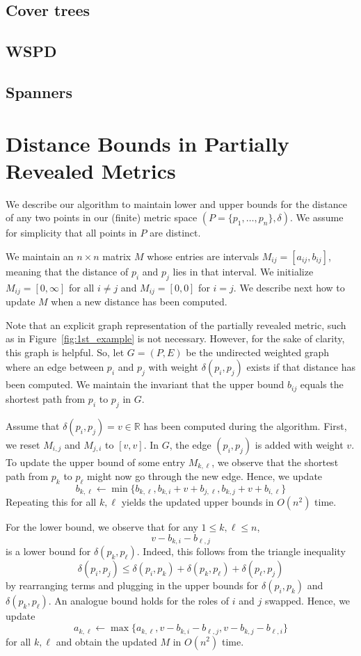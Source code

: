 \documentclass[10pt]{article}
\newcommand{\R}{\mathbb{R}}
\newcommand{\metric}{\delta}
\begin{document}
\subsection{Cover trees}

\subsection{WSPD}

\subsection{Spanners}

\section{Distance Bounds in Partially Revealed Metrics}
%
We describe our algorithm to maintain lower and upper bounds for the
distance of any two points in our (finite) metric space $(P=\{p_1,\ldots,p_n\},\metric)$. We assume for simplicity that all points in $P$ are distinct.

We maintain an $n\times n$ matrix $M$ whose entries
are intervals $M_{ij}=[a_{ij},b_{ij}]$, meaning that the distance
of $p_i$ and $p_j$ lies in that interval. 
We initialize $M_{ij}=[0,\infty]$ for all $i\neq j$
and $M_{ij}=[0,0]$ for $i=j$.
We describe next how to update $M$ when a new distance has been computed.

Note that an explicit graph representation of the partially revealed metric,
such as in Figure~\ref{fig:1st_example} is not necessary. However, for 
the sake of clarity,
this graph is helpful. So, let $G=(P,E)$ be the undirected weighted graph
where an edge between $p_i$ and $p_j$ with weight $\metric(p_i,p_j)$
exists if that distance has been computed. 
We maintain the invariant that the upper bound $b_{ij}$ equals the 
shortest path from $p_i$ to $p_j$ in $G$.

Assume that $\metric(p_i,p_j)=v\in\R$ has been computed during the algorithm.
First, we reset $M_{i,j}$ and $M_{j,i}$ to $[v,v]$. 
In $G$, the edge $(p_i,p_j)$ is added with weight $v$.
To update the upper bound of some entry $M_{k,\ell}$,
we observe that the shortest path from $p_k$ to $p_\ell$ might now
go through the new edge. Hence, we update
%
\[b_{k,\ell}\gets \min\{b_{k,\ell},b_{k,i}+v+b_{j,\ell},b_{k,j}+v+b_{i,\ell}\}\]
%
Repeating this for all $k,\ell$ yields the updated upper bounds in $O(n^2)$
time.

For the lower bound, we observe that for any $1\leq k,\ell\leq n$,
%
\[v-b_{k,i}-b_{\ell,j}\]
%
is a lower bound for $\metric(p_k,p_\ell)$. Indeed, this follows from
the triangle inequality
%
\[\metric(p_i,p_j)\leq \metric(p_i,p_k)+\metric(p_k,p_\ell)+\metric(p_\ell,p_j)\]
by rearranging terms and plugging in the upper bounds for $\metric(p_i,p_k)$
and $\metric(p_k,p_\ell)$. An analogue bound holds for the roles of $i$
and $j$ swapped. Hence, we update
%
\[a_{k,\ell}\gets \max\{a_{k,\ell},v-b_{k,i}-b_{\ell,j},v-b_{k,j}-b_{\ell,i}\}\]
%
for all $k,\ell$ and obtain the updated $M$ in $O(n^2)$ time.
\end{document}
